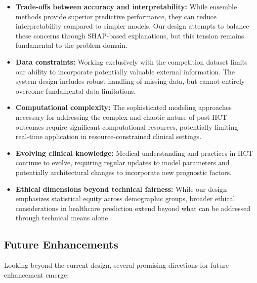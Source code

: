 \begin{itemize}
    \item \textbf{Trade-offs between accuracy and interpretability:} While ensemble methods provide superior predictive performance, they can reduce interpretability compared to simpler models. Our design attempts to balance these concerns through SHAP-based explanations, but this tension remains fundamental to the problem domain.
    
    \item \textbf{Data constraints:} Working exclusively with the competition dataset limits our ability to incorporate potentially valuable external information. The system design includes robust handling of missing data, but cannot entirely overcome fundamental data limitations.
    
    \item \textbf{Computational complexity:} The sophisticated modeling approaches necessary for addressing the complex and chaotic nature of post-HCT outcomes require significant computational resources, potentially limiting real-time application in resource-constrained clinical settings.
    
    \item \textbf{Evolving clinical knowledge:} Medical understanding and practices in HCT continue to evolve, requiring regular updates to model parameters and potentially architectural changes to incorporate new prognostic factors.
    
    \item \textbf{Ethical dimensions beyond technical fairness:} While our design emphasizes statistical equity across demographic groups, broader ethical considerations in healthcare prediction extend beyond what can be addressed through technical means alone.
\end{itemize}

\subsection{Future Enhancements}

Looking beyond the current design, several promising directions for future enhancement emerge:

